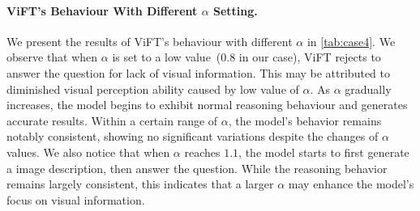 


\paragraph{ViFT's Behaviour With Different $\alpha$ Setting.} We present the results of ViFT's behaviour with different $\alpha$ in \autoref{tab:case4}. We observe that when $\alpha$ is set to a low value~(0.8 in our case), ViFT rejects to answer the question for lack of visual information. This may be attributed to diminished visual perception ability caused by low value of $\alpha$. As $\alpha$ gradually increases, the model begins to exhibit normal reasoning behaviour and generates accurate results. Within a certain range of $\alpha$, the model's behavior remains notably consistent, showing no significant variations despite the changes of $\alpha$ values. We also notice that when $\alpha$ reaches $1.1$, the model starts to first generate a image description, then answer the question. While the reasoning behavior remains largely consistent, this indicates that a larger $\alpha$ may enhance the model's focus on visual information.

